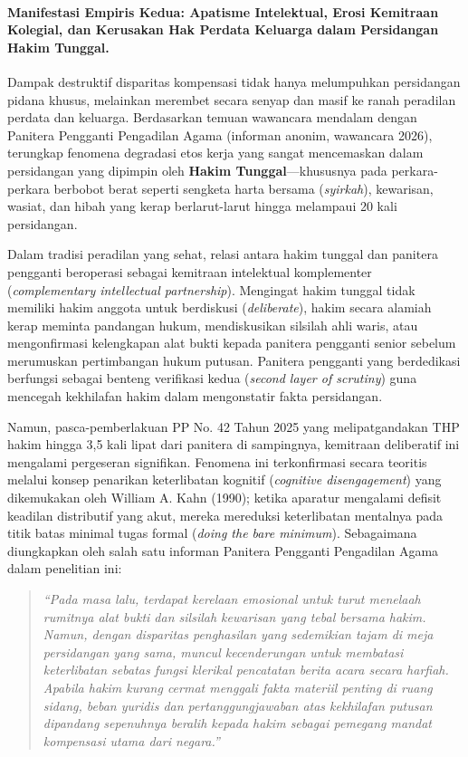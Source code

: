 \documentclass[12pt, a4paper]{article}
\begin{document}
\paragraph{Manifestasi Empiris Kedua: Apatisme Intelektual, Erosi Kemitraan Kolegial, dan Kerusakan Hak Perdata Keluarga dalam Persidangan Hakim Tunggal.}
Dampak destruktif disparitas kompensasi tidak hanya melumpuhkan persidangan pidana khusus, melainkan merembet secara senyap dan masif ke ranah peradilan perdata dan keluarga. Berdasarkan temuan wawancara mendalam dengan Panitera Pengganti Pengadilan Agama (informan anonim, wawancara 2026), terungkap fenomena degradasi etos kerja yang sangat mencemaskan dalam persidangan yang dipimpin oleh \textbf{Hakim Tunggal}---khususnya pada perkara-perkara berbobot berat seperti sengketa harta bersama (\textit{syirkah}), kewarisan, wasiat, dan hibah yang kerap berlarut-larut hingga melampaui 20 kali persidangan.

Dalam tradisi peradilan yang sehat, relasi antara hakim tunggal dan panitera pengganti beroperasi sebagai kemitraan intelektual komplementer (\textit{complementary intellectual partnership}). Mengingat hakim tunggal tidak memiliki hakim anggota untuk berdiskusi (\textit{deliberate}), hakim secara alamiah kerap meminta pandangan hukum, mendiskusikan silsilah ahli waris, atau mengonfirmasi kelengkapan alat bukti kepada panitera pengganti senior sebelum merumuskan pertimbangan hukum putusan. Panitera pengganti yang berdedikasi berfungsi sebagai benteng verifikasi kedua (\textit{second layer of scrutiny}) guna mencegah kekhilafan hakim dalam mengonstatir fakta persidangan.

Namun, pasca-pemberlakuan PP No. 42 Tahun 2025 yang melipatgandakan THP hakim hingga 3,5 kali lipat dari panitera di sampingnya, kemitraan deliberatif ini mengalami pergeseran signifikan. Fenomena ini terkonfirmasi secara teoritis melalui konsep penarikan keterlibatan kognitif (\textit{cognitive disengagement}) yang dikemukakan oleh William A. Kahn (1990); ketika aparatur mengalami defisit keadilan distributif yang akut, mereka mereduksi keterlibatan mentalnya pada titik batas minimal tugas formal (\textit{doing the bare minimum}). Sebagaimana diungkapkan oleh salah satu informan Panitera Pengganti Pengadilan Agama dalam penelitian ini:
\begin{quote}
    \textit{``Pada masa lalu, terdapat kerelaan emosional untuk turut menelaah rumitnya alat bukti dan silsilah kewarisan yang tebal bersama hakim. Namun, dengan disparitas penghasilan yang sedemikian tajam di meja persidangan yang sama, muncul kecenderungan untuk membatasi keterlibatan sebatas fungsi klerikal pencatatan berita acara secara harfiah. Apabila hakim kurang cermat menggali fakta materiil penting di ruang sidang, beban yuridis dan pertanggungjawaban atas kekhilafan putusan dipandang sepenuhnya beralih kepada hakim sebagai pemegang mandat kompensasi utama dari negara.''}
\end{quote}
\end{document}
